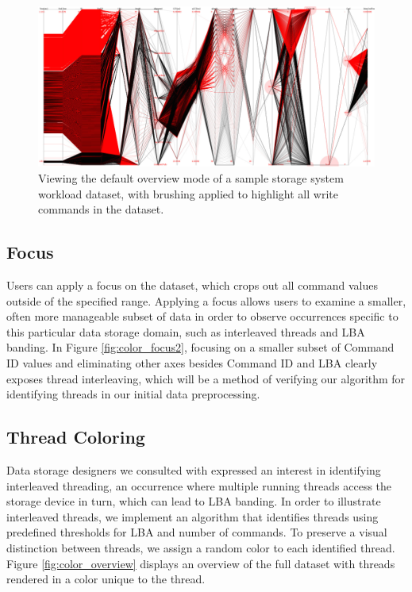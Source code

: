 \documentclass[journal]{vgtc}                %
\begin{document}
\begin{figure}[h!]
 \centering
 \includegraphics[width=\columnwidth]{images/demo.eps}
 \caption[Storage system workload dataset with write commands brushed.]{Viewing the default overview mode of a sample storage system workload dataset, with brushing applied to highlight all write commands in the dataset.}
 \label{fig:brush2}
\end{figure}

\subsection{Focus}
Users can apply a focus on the dataset, which crops out all command values outside of the specified range. Applying a focus allows users to examine a smaller, often more manageable subset of data in order to observe occurrences specific to this particular data storage domain, such as interleaved threads and LBA banding. In Figure \ref{fig:color_focus2}, focusing on a smaller subset of Command ID values and eliminating other axes besides Command ID and LBA clearly exposes thread interleaving, which will be a method of verifying our algorithm for identifying threads in our initial data preprocessing.

\subsection{Thread Coloring}
Data storage designers we consulted with expressed an interest in identifying interleaved threading, an occurrence where multiple running threads access the storage device in turn, which can lead to LBA banding. In order to illustrate interleaved threads, we implement an algorithm that identifies threads using predefined thresholds for LBA and number of commands. To preserve a visual distinction between threads, we assign a random color to each identified thread. Figure \ref{fig:color_overview} displays an overview of the full dataset with threads rendered in a color unique to the thread.
\end{document}

